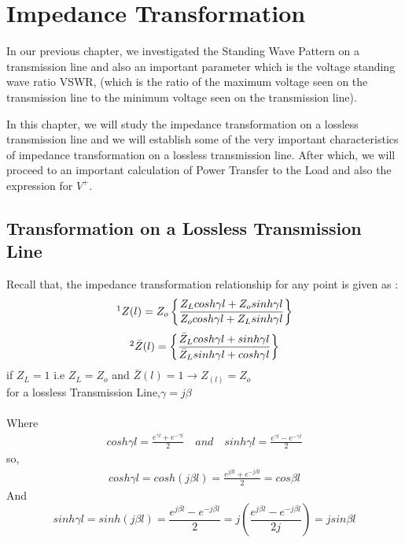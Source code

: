 \chapter{Impedance Transformation}\label{lec:lec6}
In our previous chapter, we investigated the Standing Wave Pattern on a transmission line and also an important parameter which is the voltage standing wave ratio VSWR, (which is the ratio of the maximum voltage seen on the transmission line to the minimum voltage seen on the transmission line).

In this chapter, we will study the impedance transformation on a lossless
transmission line and we will establish some of the very important characteristics of impedance transformation on a lossless transmission line. After which, we will proceed to an important calculation of Power Transfer to the Load and also the expression for $V^{+}$.
\section{Transformation on a Lossless Transmission Line}
Recall that, the impedance transformation relationship for any point is given as :
\begin{align*}
\footnotemark[1]Z(l) = Z_o\left\lbrace \frac{Z_Lcosh\gamma l + Z_osinh\gamma l}{Z_ocosh\gamma l + Z_Lsinh\gamma l}\right\rbrace 
\end{align*}
\begin{align*}
\footnotemark[2]\bar{Z}(l) = \left\lbrace \frac{\bar{Z}_Lcosh\gamma l + sinh\gamma l}{\bar{Z}_Lsinh\gamma l + cosh\gamma l}\right\rbrace 
\end{align*}
if $Z_L = 1$ i.e $Z_L = Z_o$ and $\bar{Z}(l) = 1 \rightarrow  Z_(l) = Z_o$\\
for a lossless Transmission Line,$\gamma=j\beta$\\\\
Where
\begin{align*}
cosh\gamma l = \frac{e^{\gamma l} + e^{-\gamma l}}{2} \quad and \quad sinh\gamma l = \frac{e^{\gamma l} - e^{-\gamma l}}{2}
\end{align*}
so,
\begin{align*}
cosh\gamma l= cosh(j\beta l)=\frac{e^{j \beta l} + e^{-j \beta l}}{2}=cos\beta l
\end{align*}
And
\begin{dmath*}
sinh\gamma l=sinh(j \beta l) = \frac{e^{j \beta l} - e^{-j \beta l}}{2}=j\left( \frac{e^{j \beta l} - e^{-j \beta l}}{2j}\right) =jsin\beta l
\end{dmath*}

